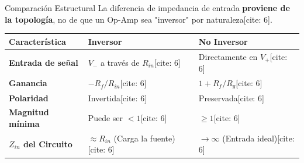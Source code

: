 \documentclass[aspectratio=169, table, xcdraw]{beamer}
\begin{document}
\begin{frame}{Comparación Estructural}
    La diferencia de impedancia de entrada \textbf{proviene de la topología}, no de que un Op-Amp sea "inversor" por naturaleza[cite: 6].
    
    \vspace{0.2cm}
    \begin{table}[]
        \centering
        \renewcommand{\arraystretch}{1.2}
        \begin{tabularx}{\textwidth}{@{} >{\bfseries}l X X @{}}
        \toprule
        \rowcolor[HTML]{EFEFEF}
        Característica & Inversor & No Inversor \\ \midrule
        Entrada de señal & $V_-$ a través de $R_{in}$[cite: 6] & Directamente en $V_+$[cite: 6] \\
        Ganancia & $-R_f / R_{in}$[cite: 6] & $1 + R_f / R_g$[cite: 6] \\
        Polaridad & Invertida[cite: 6] & Preservada[cite: 6] \\
        Magnitud mínima & Puede ser $< 1$[cite: 6] & $\ge 1$[cite: 6] \\
        $Z_{in}$ del Circuito & $\approx R_{in}$ (Carga la fuente)[cite: 6] & $\rightarrow \infty$ (Entrada ideal)[cite: 6] \\
        \bottomrule
        \end{tabularx}
    \end{table}
\end{frame}
\end{document}
